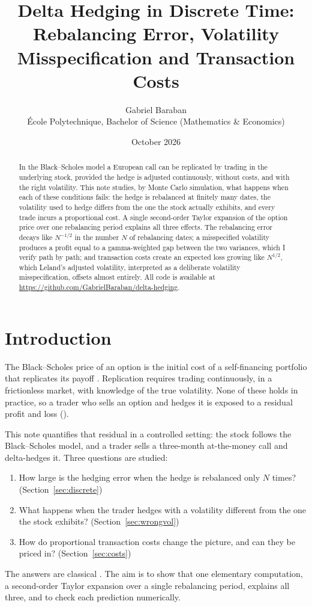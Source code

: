 \documentclass[11pt,a4paper]{article}
\title{\textbf{Delta Hedging in Discrete Time:\\[2pt]
\large Rebalancing Error, Volatility Misspecification and Transaction Costs}}
\author{Gabriel Baraban\\[2pt]
\small École Polytechnique, Bachelor of Science (Mathematics \& Economics)}
\date{October 2026}
\newcommand{\repourl}{https://github.com/GabrielBaraban/delta-hedging}
\newcommand{\PnL}{\text{P\&L}}
\begin{document}
\maketitle

\begin{abstract}
\noindent
In the Black--Scholes model a European call can be replicated by trading in the underlying stock, provided the hedge is adjusted continuously, without costs, and with the right volatility. This note studies, by Monte Carlo simulation, what happens when each of these conditions fails: the hedge is rebalanced at finitely many dates, the volatility used to hedge differs from the one the stock actually exhibits, and every trade incurs a proportional cost. A single second-order Taylor expansion of the option price over one rebalancing period explains all three effects. The rebalancing error decays like $N^{-1/2}$ in the number $N$ of rebalancing dates; a misspecified volatility produces a profit equal to a gamma-weighted gap between the two variances, which I verify path by path; and transaction costs create an expected loss growing like $N^{1/2}$, which Leland's adjusted volatility, interpreted as a deliberate volatility misspecification, offsets almost entirely. All code is available at \url{\repourl}.
\end{abstract}

\section{Introduction}

The Black--Scholes price of an option is the initial cost of a self-financing portfolio that replicates its payoff \cite{BlackScholes1973}. Replication requires trading continuously, in a frictionless market, with knowledge of the true volatility. None of these holds in practice, so a trader who sells an option and hedges it is exposed to a residual profit and loss (\PnL).

This note quantifies that residual in a controlled setting: the stock follows the Black--Scholes model, and a trader sells a three-month at-the-money call and delta-hedges it. Three questions are studied:
\begin{enumerate}
  \item How large is the hedging error when the hedge is rebalanced only $N$ times? (Section~\ref{sec:discrete})
  \item What happens when the trader hedges with a volatility different from the one the stock exhibits? (Section~\ref{sec:wrongvol})
  \item How do proportional transaction costs change the picture, and can they be priced in? (Section~\ref{sec:costs})
\end{enumerate}
The answers are classical \cite{Leland1985,DermanKamal1999}. The aim is to show that one elementary computation, a second-order Taylor expansion over a single rebalancing period, explains all three, and to check each prediction numerically.
\end{document}
